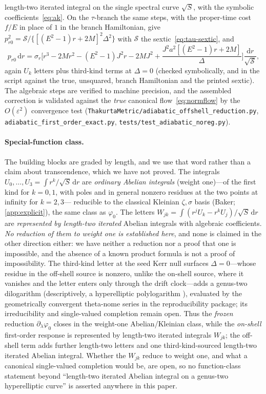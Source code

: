 \documentclass[12pt]{iopart}
\theoremstyle{plain}
\theoremstyle{definition}
\theoremstyle{remark}
\newcommand{\dd}{\mathrm{d}}
\begin{document}
length-two iterated integral on the single spectral curve $\sqrt S$, with the symbolic
coefficients~\eqref{eq:ak}. On the $\tau$-branch the same steps, with the proper-time
cost $f/E$ in place of $1$ in the branch Hamiltonian, give
$p_{r0}^2=\mathcal S/\{[(E^2-1)r+2M]^2\Delta^2\}$ with $\mathcal S$ the sextic~\eqref{eq:tau-sextic},
and
\begin{equation}
    p_{r0}\,\dd r=\sigma_r\Big[r^3-2Mr^2-(E^2-1)J^2r-2MJ^2
    +\frac{J^2a^2[(E^2-1)r+2M]}{\Delta}\Big]\frac{\dd r}{\sqrt{\mathcal S}},
    \label{eq:action-reduction-tau}
\end{equation}
again $U_k$ letters plus third-kind terms at $\Delta=0$ (checked symbolically, and in the
script against the true, unsquared, branch Hamiltonian and the printed sextic). The
algebraic steps are verified to machine precision, and the assembled correction is validated
against the \emph{true} canonical flow~\eqref{eq:normflow} by the $O(\varepsilon^2)$ convergence
test
(\texttt{ThakurtaMetric/adiabatic\_offshell\_reduction.py},
\texttt{adiabatic\_first\_order\_exact.py}, \texttt{tests/test\_adiabatic\_noreg.py}).

\paragraph{Special-function class.} The building blocks are graded by length, and
we use that word rather than a claim about transcendence, which we have not
proved. The integrals $U_0,\dots,U_3=\int r^k/\sqrt S\,\dd r$ are
\emph{ordinary Abelian integrals} (weight one)---of the first kind for $k=0,1$, with poles
and in general nonzero residues at the two points at infinity for $k=2,3$--- reducible to the classical Kleinian
$\zeta,\sigma$ basis (Baker; \ref{app:explicit}), the same class as $\varphi_0$. The
letters $W_{jk}=\int(r^jU_k-r^kU_j)/\sqrt S\,\dd r$ are \emph{represented by
length-two iterated} Abelian integrals with algebraic coefficients. \emph{No
reduction of them to weight one is established here}, and none is claimed in the
other direction either: we have neither a reduction nor a proof that one is
impossible, and the absence of a known product formula is not a proof of
impossibility. The third-kind letter at the seed Kerr null surfaces
$\Delta=0$---whose residue in the off-shell source is nonzero, unlike the on-shell
source, where it vanishes and the letter enters only through the drift clock---adds a genus-two dilogarithm (descriptively, a hyperelliptic polylogarithm
\cite{BauneEtal2024,DHokerHiddingSchlotterer2025}), evaluated by the geometrically
convergent theta-nome series in the reproducibility package; its irreducibility and
single-valued completion remain open. Thus the \emph{frozen} reduction
$\partial_\lambda\varphi_0$ closes in the weight-one Abelian/Kleinian class, while the
\emph{on-shell} first-order response is represented by length-two iterated
integrals $W_{jk}$; the off-shell term adds further length-two letters
and one third-kind-sourced length-two iterated Abelian integral. Whether the
$W_{jk}$ reduce to weight one, and what a canonical single-valued completion would
be, are open, so no
function-class statement beyond ``length-two iterated Abelian integral on a genus-two
hyperelliptic curve'' is asserted anywhere in this paper.
\end{document}
